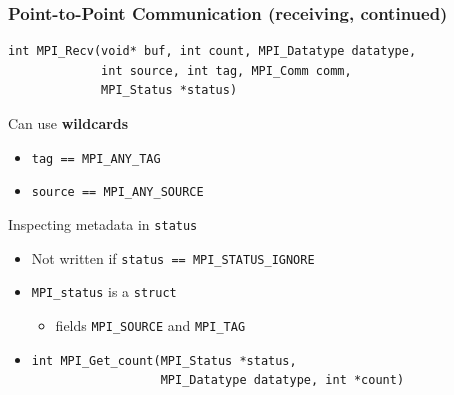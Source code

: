\documentclass[xcolor={x11names,svgnames,psnames}]{beamer}
\begin{document}
\begin{frame}[fragile=singleslide]
  \frametitle{Point-to-Point Communication (receiving, continued)}

\begin{verbatim}
int MPI_Recv(void* buf, int count, MPI_Datatype datatype,
             int source, int tag, MPI_Comm comm,
             MPI_Status *status)
\end{verbatim}

  \begin{block}{Can use \textbf{wildcards}}
    \begin{itemize}
      \item \texttt{tag == MPI_ANY_TAG}
      \item \texttt{source == MPI_ANY_SOURCE}
      \end{itemize}
    \end{block}

    \begin{exampleblock}{Inspecting metadata in \texttt{status}}
      \begin{itemize}
      \item Not written if \texttt{status == MPI_STATUS_IGNORE}
      \item \texttt{MPI_status} is a \texttt{struct}
        \begin{itemize}
        \item fields \texttt{MPI_SOURCE} and \texttt{MPI_TAG}
        \end{itemize}
        \vspace{-3mm}%
      \item \begin{verbatim}
int MPI_Get_count(MPI_Status *status,
                  MPI_Datatype datatype, int *count)
\end{verbatim}
        \vspace{-5mm}
\end{itemize}
    \end{exampleblock}
\end{frame}

\end{document}
